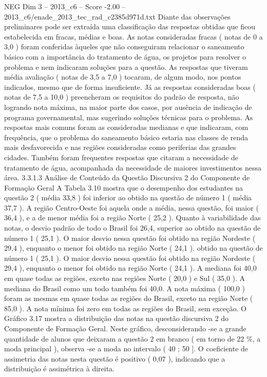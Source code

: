 \begin{textsample}{NEG Dim 3 – 2013\_c6 – Score -2.00 – 2013\_c6/enade\_2013\_tec\_rad\_c2385d971d.txt}
Diante das observações preliminares pode ser extraída uma classificação das respostas obtidas que ficou estabelecida em fracas, médias e boas.
As notas consideradas fracas ( notas de 0 a 3,0 ) foram conferidas àqueles que não conseguiram relacionar o saneamento básico com a importância do tratamento de água, os projetos para resolver o problema e nem indicaram soluções para a questão.
As respostas que tiveram média avaliação ( notas de 3,5 a 7,0 ) tocaram, de algum modo, nos pontos indicados, mesmo que de forma insuficiente.
Já as respostas consideradas boas ( notas de 7,5 a 10,0 ) preencheram os requisitos do padrão de resposta, não logrando nota máxima, na maior parte dos casos, por ausência de indicação de programa governamental, mas sugerindo soluções técnicas para o problema.
As respostas mais comuns foram as consideradas medianas e que indicaram, com frequência, que o problema do saneamento básico estaria nas classes de renda mais desfavorecida e nas regiões consideradas como periferias das grandes cidades.
Também foram frequentes respostas que citaram a necessidade de tratamento de água, acompanhada da necessidade de maiores investimentos nessa área. 3.3.1.3 Análise de Conteúdo da Questão Discursiva 2 do Componente de Formação Geral A Tabela 3.10 mostra que o desempenho dos estudantes na questão 2 ( média 33,8 ) foi inferior ao obtido na questão de número 1 ( média 37,7 ).
A região Centro-Oeste foi aquela onde a média, nessa questão, foi maior ( 36,4 ), e a de menor média foi a região Norte ( 25,2 ).
Quanto à variabilidade das notas, o desvio padrão de todo o Brasil foi 26,4, superior ao obtido na questão de número 1 ( 25,1 ).
O maior desvio nessa questão foi obtido na região Nordeste ( 29,4 ), enquanto o menor foi obtido na região Norte ( 24,1 ). obtido na questão de número 1 ( 25,1 ).
O maior desvio nessa questão foi obtido na região Nordeste ( 29,4 ), enquanto o menor foi obtido na região Norte ( 24,1 ).
A mediana foi 40,0 em quase todas as regiões, exceto nas regiões Norte ( 20,0 ) e Sul ( 35,0 ).
A mediana do Brasil como um todo também foi 40,0.
A nota máxima ( 100,0 ) foram as mesmas em quase todas as regiões do Brasil, exceto na região Norte ( 85,0 ).
A nota mínima foi zero em todas as regiões do Brasil, sem exceção.
O Gráfico 3.17 mostra a distribuição das notas na questão discursiva 2 do Componente de Formação Geral.
Neste gráfico, desconsiderando -se a grande quantidade de alunos que deixaram a questão 2 em branco ( em torno de 22 \%, a moda principal ), observa -se a moda no intervalo ( 40 ; 50 ].
O coeficiente de assimetria das notas nesta questão é positivo ( 0,07 ), indicando que a distribuição é assimétrica à direita.

\end{textsample}
